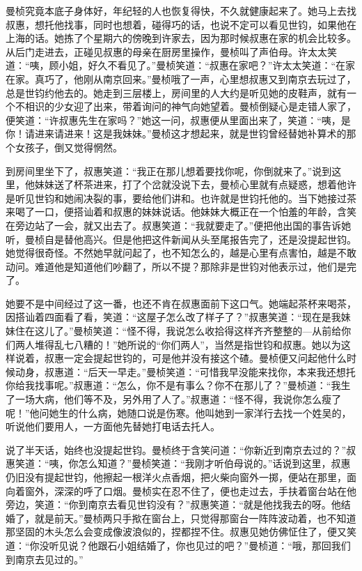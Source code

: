 \par 曼桢究竟本底子身体好，年纪轻的人也恢复得快，不久就健康起来了。她马上去找叔惠，想托他找事，同时也想着，碰得巧的话，也说不定可以看见世钧，如果他在上海的话。她拣了个星期六的傍晚到许家去，因为那时候叔惠在家的机会比较多。从后门走进去，正碰见叔惠的母亲在厨房里操作，曼桢叫了声伯母。许太太笑道：“咦，顾小姐，好久不看见了。”曼桢笑道：“叔惠在家吧？”许太太笑道：“在家在家。真巧了，他刚从南京回来。”曼桢哦了一声，心里想叔惠又到南京去玩过了，总是世钧约他去的。她走到三层楼上，房间里的人大约是听见她的皮鞋声，就有一个不相识的少女迎了出来，带着询问的神气向她望着。曼桢倒疑心是走错人家了，便笑道：“许叔惠先生在家吗？”她这一问，叔惠便从里面出来了，笑道：“咦，是你！请进来请进来！这是我妹妹。”曼桢这才想起来，就是世钧曾经替她补算术的那个女孩子，倒又觉得惘然。
\par 到房间里坐下了，叔惠笑道：“我正在那儿想着要找你呢，你倒就来了。”说到这里，他妹妹送了杯茶进来，打了个岔就没说下去，曼桢心里就有点疑惑，想着他许是听见世钧和她闹决裂的事，要给他们讲和。也许就是世钧托他的。当下她接过茶来喝了一口，便搭讪着和叔惠的妹妹说话。他妹妹大概正在一个怕羞的年龄，含笑在旁边站了一会，就又出去了。叔惠笑道：“我就要走了。”便把他出国的事告诉她听，曼桢自是替他高兴。但是他把这件新闻从头至尾报告完了，还是没提起世钧。她觉得很奇怪。不然她早就问起了，也不知怎么的，越是心里有点害怕，越是不敢动问。难道他是知道他们吵翻了，所以不提？那除非是世钧对他表示过，他们是完了。
\par 她要不是中间经过了这一番，也还不肯在叔惠面前下这口气。她端起茶杯来喝茶，因搭讪着四面看了看，笑道：“这屋子怎么改了样子了？”叔惠笑道：“现在是我妹妹住在这儿了。”曼桢笑道：“怪不得，我说怎么收拾得这样齐齐整整的—从前给你们两人堆得乱七八糟的！”她所说的“你们两人”，当然是指世钧和叔惠。她以为这样说着，叔惠一定会提起世钧的，可是他并没有接这个碴。曼桢便又问起他什么时候动身，叔惠道：“后天一早走。”曼桢笑道：“可惜我早没能来找你，本来我还想托你给我找事呢。”叔惠道：“怎么，你不是有事么？你不在那儿了？”曼桢道：“我生了一场大病，他们等不及，另外用了人了。”叔惠道：“怪不得，我说你怎么瘦了呢！”他问她生的什么病，她随口说是伤寒。他叫她到一家洋行去找一个姓吴的，听说他们要用人，一方面他先替她打电话去托人。
\par 说了半天话，始终也没提起世钧。曼桢终于含笑问道：“你新近到南京去过的？”叔惠笑道：“咦，你怎么知道？”曼桢笑道：“我刚才听伯母说的。”话说到这里，叔惠仍旧没有提起世钧，他擦起一根洋火点香烟，把火柴向窗外一掷，便站在那里，面向着窗外，深深的呼了口烟。曼桢实在忍不住了，便也走过去，手扶着窗台站在他旁边，笑道：“你到南京去看见世钧没有？”叔惠笑道：“就是他找我去的呀。他结婚了，就是前天。”曼桢两只手揿在窗台上，只觉得那窗台一阵阵波动着，也不知道那坚固的木头怎么会变成像波浪似的，捏都捏不住。叔惠见她仿佛怔住了，便又笑道：“你没听见说？他跟石小姐结婚了，你也见过的吧？”曼桢道：“哦，那回我们到南京去见过的。”
